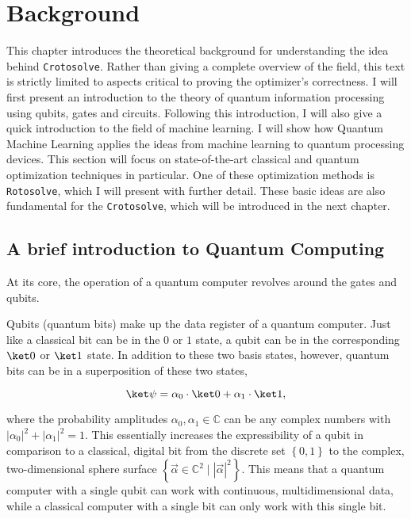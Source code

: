 \chapter{Background}
\label{chap:background}

This chapter introduces the theoretical background for understanding the idea
behind \texttt{Crotosolve}.
Rather than giving a complete overview of the field, this text is strictly
limited to aspects critical to proving the optimizer's correctness.
I will first present an introduction to the theory of quantum information
processing using qubits, gates and circuits.
Following this introduction, I will also give a quick introduction to the field
of machine learning.
I will show how Quantum Machine Learning applies the ideas from machine learning
to quantum processing devices.
This section will focus on state-of-the-art classical and quantum optimization techniques in
particular.
One of these optimization methods is \texttt{Rotosolve}, which I will present
with further detail.
These basic ideas are also fundamental for the \texttt{Crotosolve}, which will
be introduced in the next chapter.

\section{A brief introduction to Quantum Computing}
At its core, the operation of a quantum computer revolves around the gates and
qubits.

Qubits (quantum bits) make up the data register of a quantum computer.
Just like a classical bit can be in the $0$ or $1$ state, a qubit can be in the
corresponding $\ket 0$ or $\ket 1$ state.
In addition to these two basis states, however, quantum bits can be in a
superposition of these two states,

$$\ket \psi = \alpha_0 \cdot \ket 0 + \alpha_1 \cdot \ket 1,$$

where the probability amplitudes $\alpha_0, \alpha_1 \in \mathbb C$ can be any
complex numbers with $\left|\alpha_0\right|^2 + \left|\alpha_1\right|^2 = 1$.
This essentially increases the expressibility of a qubit in comparison to a
classical, digital bit from the discrete set $\left\{0, 1\right\}$ to the complex,
two-dimensional sphere surface
$\left\{\vec \alpha \in \mathbb C^2 \mid \left|\vec\alpha\right|^2\right\}$.
This means that a quantum computer with a single qubit can work with continuous,
multidimensional data, while a classical computer with a single bit can only
work with this single bit.

